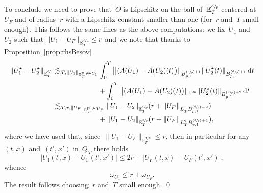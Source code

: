\documentclass[10pt]{amsart}
\newcommand{\Psfrac}[2]{(\sfrac{#1}{#2})}
\theoremstyle{definition}
\newcommand\dd{\mathrm{d}}
\renewcommand\L{\mathrm{L}}
\begin{document}
To conclude we need to prove that~$\Theta$ is Lipschitz on the ball of~${\mathbb E}^{\sfrac dp}_T$ centered at~$U_F$ and of radius~$r$ with a Lipschitz constant smaller than one (for~$r$ and~$T$ small enough). This follows the same lines as the above computations: we fix~$U_1$ and~$U_2$ such that~$\| U_i-U_F\|_{{\mathbb E}^{\sfrac dp}_T} \leq r$ and we note that thanks to Proposition~\ref{prop:rhsBesov}
\[
\begin{aligned}
\|U_1^\star-U_2^\star\|_{{\mathbb E}^{\sfrac dp}_T} & \lesssim_{T, \|U_1\|_{\mathbb G^p_T},\omega_{U_1} } \int_0^T \big \|(A(U_1)- A(U_2)(t)\bigr)\|_{B_{p,1}^{\Psfrac dp+1}} \|U_2^\star(t)\|_{B_{p,1}^{\Psfrac dp+1}} \, \dd t\\
&\hspace*{2.22cm} + \int_0^T \big \|(A(U_1)- A(U_2)(t)\bigr)\|_{\L^\infty} \|U_2^\star(t)\|_{B_{p,1}^{\Psfrac dp+2}} \, \dd t \\
& \lesssim_{T, r,\|U_F\|_{\mathbb G^p_T},\omega_{U_F} } \|U_1 -U_2 \|_{{\mathbb E}^{\sfrac dp}_T} (r+ \|U_F\|_{L^1_TB_{p,1}^{\Psfrac dp+2}}) \\
&\hspace*{2.22cm} +
\|U_1 -U_2 \|_{{\mathbb E}^{\sfrac dp}_T}(r+ \|U_F\|_{L^2_TB_{p,1}^{\Psfrac dp+1}}),
\end{aligned}
\]
where we have used that, since~$\|U_1-U_F\|_{\mathbb{E}_T^{d/p}} \leq r$, then in particular for any~$(t,x) $ and~$ (t',x') $ in~$Q_T$ there holds
\[
|U_1(t,x) - U_1(t',x')| \leq 2r + |U_F(t,x)-U_F(t',x')|,
\]
whence
\[
\omega_{U_1} \leq r + \omega_{U_F}.
\]
The result follows choosing~$r$ and~$T$ small enough.
\qed

\appendix
\end{document}
